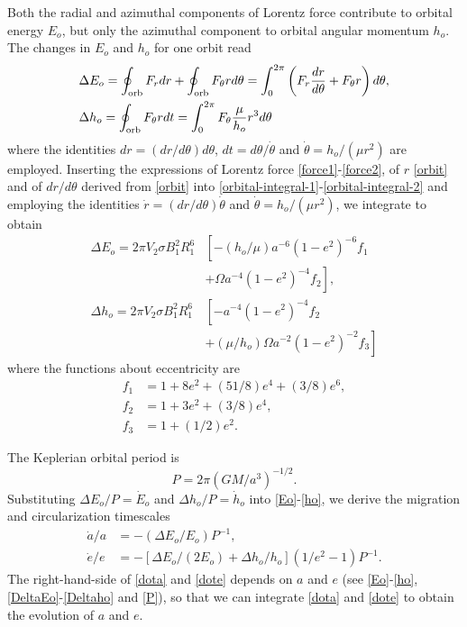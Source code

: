 \documentclass[twocolumn,linenumbers]{aastex631}
\begin{document}
Both the radial and azimuthal components of Lorentz force contribute to orbital energy $E_o$, but only the azimuthal component to orbital angular momentum $h_o$. The changes in $E_o$ and $h_o$ for one orbit read
\begin{align}
& \Delta E_o=\oint_{\rm orb} F_rdr+\oint_{\rm orb} F_\theta rd\theta = \int_0^{2\pi}\left(F_r\frac{dr}{d\theta}+F_\theta r\right)d\theta, \label{orbital-integral-1} \\
& \Delta h_o = \oint_{\rm orb} F_\theta rdt=\int_0^{2\pi} F_\theta\frac{\mu}{h_o}r^3d\theta \label{orbital-integral-2}
\end{align}
where the identities $dr=(dr/d\theta)d\theta$, $dt=d\theta/\dot\theta$ and $\dot\theta=h_o/(\mu r^2)$ are employed. Inserting the expressions of Lorentz force \eqref{force1}-\eqref{force2}, of $r$ \eqref{orbit} and of $dr/d\theta$ derived from \eqref{orbit} into \eqref{orbital-integral-1}-\eqref{orbital-integral-2} and employing the identities $\dot r=(dr/d\theta)\dot\theta$ and $\dot\theta=h_o/(\mu r^2)$, we integrate to obtain
\begin{align}
\Delta E_o=2\pi V_2\sigma B_1^2R_1^6 & \left[-(h_o/\mu)a^{-6}(1-e^2)^{-6}f_1\right.  \nonumber \\
& \left. +\Omega a^{-4}(1-e^2)^{-4}f_2\right], \label{DeltaEo} \\
\Delta h_o=2\pi V_2\sigma B_1^2R_1^6 & \left[-a^{-4}(1-e^2)^{-4}f_2\right. \nonumber \\
& \left. +(\mu/h_o)\Omega a^{-2}(1-e^2)^{-2}f_3\right] \label{Deltaho}
\end{align}
where the functions about eccentricity are
\begin{align}
f_1 & =1+8e^2+(51/8)e^4+(3/8)e^6,  \\
f_2 & =1+3e^2+(3/8)e^4,  \\
f_3 & =1+(1/2)e^2.
\end{align}

The Keplerian orbital period is 
\begin{equation}\label{P}
P=2\pi(GM/a^3)^{-1/2}.
\end{equation}
Substituting $\Delta E_o/P=\dot E_o$ and $\Delta h_o/P=\dot h_o$ into \eqref{Eo}-\eqref{ho}, we derive the migration and circularization timescales
\begin{align}
\dot a/a & =-(\Delta E_o/E_o)P^{-1} , \label{dota} \\
\dot e/e & =-\left[\Delta E_o/(2E_o)+\Delta h_o/h_o\right](1/e^2-1)P^{-1}. \label{dote}
\end{align}
The right-hand-side of \eqref{dota} and \eqref{dote} depends on $a$ and $e$ (see \eqref{Eo}-\eqref{ho}, \eqref{DeltaEo}-\eqref{Deltaho} and \eqref{P}), so that we can integrate \eqref{dota} and \eqref{dote} to obtain the evolution of $a$ and $e$.
\end{document}
